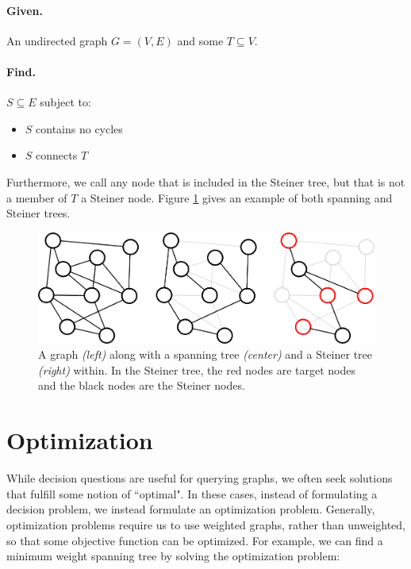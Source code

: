 \documentclass[12pt,twoside]{reedthesis}
\theoremstyle{definition}
\begin{document}
   \bigbreak

   \hfill\begin{minipage}{\dimexpr\textwidth-2cm}
   \paragraph{Given.}An undirected graph $G=(V,E)$ and some $T \subseteq V$.
   \paragraph{Find.}$S \subseteq E$ subject to:
   \begin{itemize}
     \item{$S$ contains no cycles}
     \item{$S$ connects $T$}
   \end{itemize}
\xdef\tpd{\the\prevdepth}
\end{minipage}

   \bigbreak

   Furthermore, we call any node that is included in the Steiner tree, but that is not a member of $T$ a Steiner node. Figure \ref{fig:graph1} gives an example of both spanning and Steiner trees.

   \begin{figure}[!h]
     \begin{center}
       \includegraphics[width=\textwidth]{graph1}
     \caption[Spanning and Steiner trees.]{A graph \textit{(left)} along with a spanning tree \textit{(center)} and a Steiner tree \textit{(right)} within. In the Steiner tree, the red nodes are target nodes and the black nodes are the Steiner nodes.}
     \label{fig:graph1}
     \end{center}
   \end{figure}

 \section{Optimization}
 While decision questions are useful for querying graphs, we often seek solutions that fulfill some notion of ``optimal". In these cases, instead of formulating a decision problem, we instead formulate an optimization problem. Generally, optimization problems require us to use weighted graphs, rather than unweighted, so that some objective function can be optimized. For example, we can find a minimum weight spanning tree by solving the optimization problem:
\end{document}
